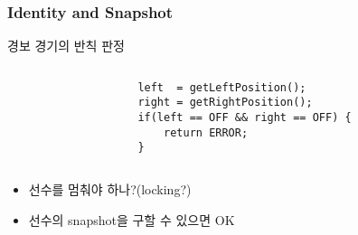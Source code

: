 \begin{frame}[fragile]
\frametitle{Identity and Snapshot}

경보 경기의 반칙 판정
\begin{columns}[t]
  \begin{column}{.5\textwidth}
\\
  \end{column}
  \begin{column}{.5\textwidth}
  \lstset{language=Java,basicstyle=\ttfamily\small}
  \begin{lstlisting}
left  = getLeftPosition();
right = getRightPosition();
if(left == OFF && right == OFF) {
    return ERROR;
}
  \end{lstlisting}
  \end{column}
\end{columns}

\begin{itemize}
\item 선수를 멈춰야 하나?(locking?)
\item 선수의 snapshot을 구할 수 있으면 OK
\end{itemize}

\end{frame}


